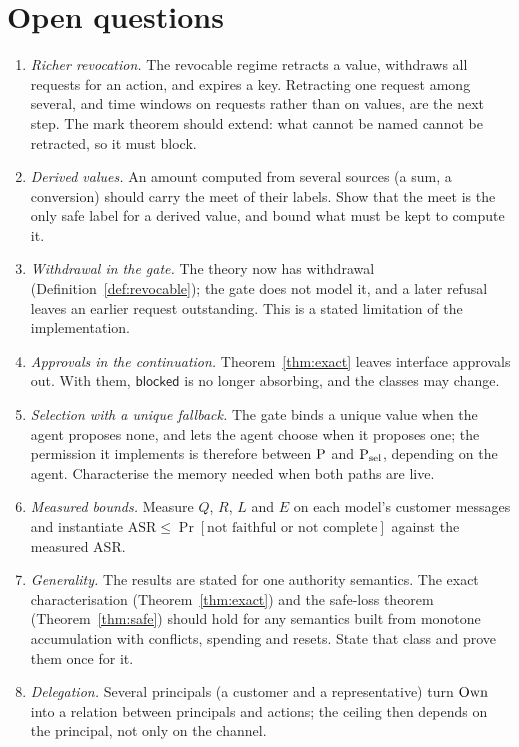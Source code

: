 \section{Open questions}\label{sec:open}

\begin{enumerate}
\item \emph{Richer revocation.} The revocable regime retracts a value, withdraws all requests
  for an action, and expires a key. Retracting one request among several, and time windows on
  requests rather than on values, are the next step. The mark theorem should extend: what cannot
  be named cannot be retracted, so it must block.
\item \emph{Derived values.} An amount computed from several sources (a sum, a conversion)
  should carry the meet of their labels. Show that the meet is the only safe label for a derived
  value, and bound what must be kept to compute it.
\item \emph{Withdrawal in the gate.} The theory now has withdrawal (Definition~\ref{def:revocable});
  the gate does not model it, and a later refusal leaves an earlier request outstanding. This is
  a stated limitation of the implementation.
\item \emph{Approvals in the continuation.} Theorem~\ref{thm:exact} leaves interface
  approvals out. With them, $\mathsf{blocked}$ is no longer absorbing, and the classes may
  change.
\item \emph{Selection with a unique fallback.} The gate binds a unique value when the agent
  proposes none, and lets the agent choose when it proposes one; the permission it implements is
  therefore between $\mathrm{P}$ and $\mathrm{P}_{\mathrm{sel}}$, depending on the agent. Characterise the
  memory needed when both paths are live.
\item \emph{Measured bounds.} Measure $Q$, $R$, $L$ and $E$ on each model's customer messages and
  instantiate $\mathrm{ASR} \le \Pr[\text{not faithful or not complete}]$ against the measured ASR.
\item \emph{Generality.} The results are stated for one authority semantics. The exact
  characterisation (Theorem~\ref{thm:exact}) and the safe-loss theorem (Theorem~\ref{thm:safe})
  should hold for any semantics built from monotone accumulation with conflicts, spending and
  resets. State that class and prove them once for it.
\item \emph{Delegation.} Several principals (a customer and a representative) turn $\mathrm{Own}$ into a
  relation between principals and actions; the ceiling then depends on the principal, not only on
  the channel.
\end{enumerate}
